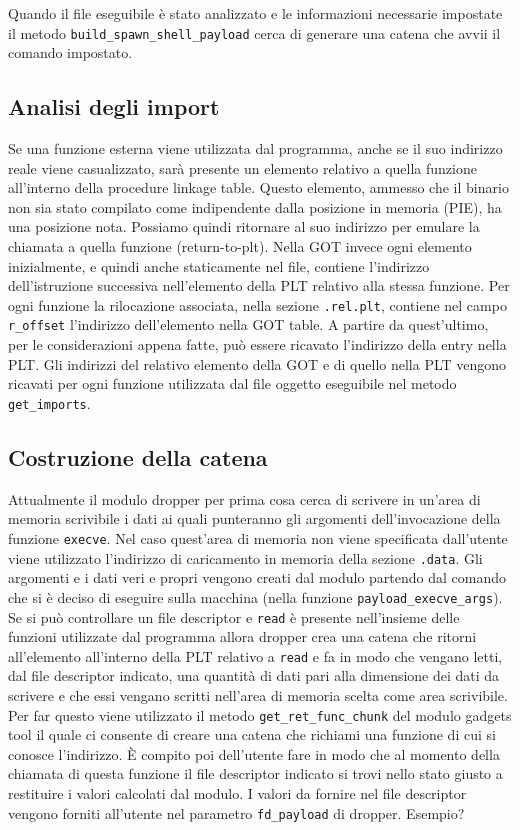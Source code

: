 Quando il file eseguibile è stato analizzato e le informazioni
necessarie impostate il metodo \lstinline{build_spawn_shell_payload}
cerca di generare una catena che avvii il comando impostato.

\subsection{Analisi degli import}

Se una funzione esterna viene utilizzata dal programma, anche se il
suo indirizzo reale viene casualizzato, sarà presente un elemento
relativo a quella funzione all'interno della procedure linkage
table. Questo elemento, ammesso che il binario non sia stato compilato
come indipendente dalla posizione in memoria (PIE), ha una posizione
nota. Possiamo quindi ritornare al suo indirizzo per emulare la
chiamata a quella funzione (return-to-plt). Nella GOT invece ogni
elemento inizialmente, e quindi anche staticamente nel file, contiene
l'indirizzo dell'istruzione successiva nell'elemento della PLT
relativo alla stessa funzione. Per ogni funzione la rilocazione
associata, nella sezione \lstinline{.rel.plt}, contiene nel campo
\lstinline{r_offset} l'indirizzo dell'elemento nella GOT table. A
partire da quest'ultimo, per le considerazioni appena fatte, può
essere ricavato l'indirizzo della entry nella PLT. Gli indirizzi del
relativo elemento della GOT e di quello nella PLT vengono ricavati per
ogni funzione utilizzata dal file oggetto eseguibile nel metodo
\lstinline{get_imports}.

\subsection{Costruzione della catena}

Attualmente il modulo dropper per prima cosa cerca di scrivere in
un'area di memoria scrivibile i dati ai quali punteranno gli argomenti
dell'invocazione della funzione \lstinline{execve}. Nel caso
quest'area di memoria non viene specificata dall'utente viene
utilizzato l'indirizzo di caricamento in memoria della sezione
\lstinline{.data}. Gli argomenti e i dati veri e propri vengono creati
dal modulo partendo dal comando che si è deciso di eseguire sulla
macchina (nella funzione \lstinline{payload_execve_args}). Se si può
controllare un file descriptor e \lstinline{read} è presente
nell'insieme delle funzioni utilizzate dal programma allora dropper
crea una catena che ritorni all'elemento all'interno della PLT
relativo a \lstinline{read} e fa in modo che vengano letti, dal file
descriptor indicato, una quantità di dati pari alla dimensione dei
dati da scrivere e che essi vengano scritti nell'area di memoria
scelta come area scrivibile. Per far questo viene utilizzato il metodo
\lstinline{get_ret_func_chunk} del modulo gadgets tool il quale ci
consente di creare una catena che richiami una funzione di cui si
conosce l'indirizzo. È compito poi dell'utente fare in modo che al
momento della chiamata di questa funzione il file descriptor indicato
si trovi nello stato giusto a restituire i valori calcolati dal
modulo. I valori da fornire nel file descriptor vengono forniti
all'utente nel parametro \lstinline{fd_payload} di dropper.
Esempio?

